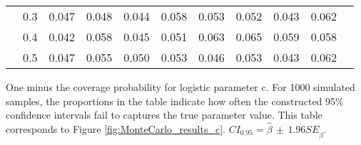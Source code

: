 \documentclass[12pt]{article}
\theoremstyle{definition}
\begin{document}
\begin{table}[b!]
\begin{threeparttable}
{\begin{tabular}[r]{l l l r r r r r r r r}
          & 0.3 & 0.047 & 0.048 & 0.044 & 0.058 & 0.053 & 0.052 & 0.043 & 0.062 \\
          & 0.4 & 0.042 & 0.058 & 0.045 & 0.051 & 0.063 & 0.065 & 0.059 & 0.058 \\
          & 0.5 & 0.047 & 0.055 & 0.050 & 0.053 & 0.046 & 0.053 & 0.043 & 0.062 \\
  \hline
    \end{tabular}
    }
    \begin{tablenotes}
      \item{\footnotesize One minus the coverage probability for logistic parameter c. For 1000 simulated samples, the proportions in the table indicate how often the constructed 95\% confidence intervals fail to captures the true parameter value. This table corresponds to Figure \ref{fig:MonteCarlo_results_c}. $CI_{0.95} = \hat\beta \, \pm \, 1.96 SE_{\hat{\beta}}$.}
    \end{tablenotes} \label{tbl:coverage_ratio_c}
  \end{threeparttable}
\end{table}
\end{document}
